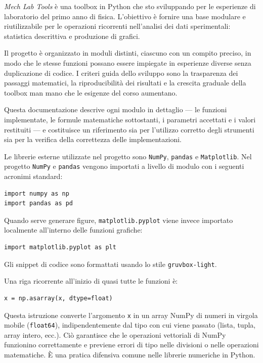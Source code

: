 
\textit{Mech Lab Tools} è una toolbox in Python che sto sviluppando per le esperienze di laboratorio del primo anno di fisica. L'obiettivo è fornire una base modulare e riutilizzabile per le operazioni ricorrenti nell'analisi dei dati sperimentali: statistica descrittiva e produzione di grafici.

Il progetto è organizzato in moduli distinti, ciascuno con un compito preciso, in modo che le stesse funzioni possano essere impiegate in esperienze diverse senza duplicazione di codice. I criteri guida dello sviluppo sono la trasparenza dei passaggi matematici, la riproducibilità dei risultati e la crescita graduale della toolbox man mano che le esigenze del corso aumentano.

Questa documentazione descrive ogni modulo in dettaglio — le funzioni implementate, le formule matematiche sottostanti, i parametri accettati e i valori restituiti — e costituisce un riferimento sia per l'utilizzo corretto degli strumenti sia per la verifica della correttezza delle implementazioni.


Le librerie esterne utilizzate nel progetto sono \texttt{NumPy}, \texttt{pandas} e \texttt{Matplotlib}. Nel progetto \texttt{NumPy} e \texttt{pandas} vengono importati a livello di modulo con i seguenti acronimi standard:
\begin{verbatim}
import numpy as np
import pandas as pd
\end{verbatim}

Quando serve generare figure, \texttt{matplotlib.pyplot} viene invece importato localmente all'interno delle funzioni grafiche:
\begin{verbatim}
import matplotlib.pyplot as plt
\end{verbatim}

Gli snippet di codice sono formattati usando lo stile \texttt{gruvbox-light}.

Una riga ricorrente all'inizio di quasi tutte le funzioni è:
\begin{verbatim}
x = np.asarray(x, dtype=float)
\end{verbatim}
Questa istruzione converte l'argomento \texttt{x} in un array NumPy di numeri in virgola mobile (\texttt{float64}), indipendentemente dal tipo con cui viene passato (lista, tupla, array intero, ecc.). Ciò garantisce che le operazioni vettoriali di NumPy funzionino correttamente e previene errori di tipo nelle divisioni o nelle operazioni matematiche. È una pratica difensiva comune nelle librerie numeriche in Python.
\hfill
